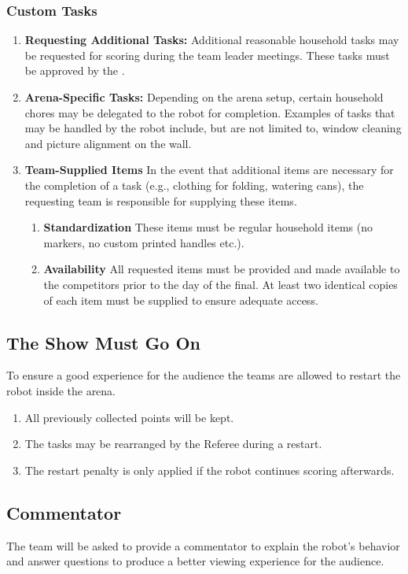 \subsubsection{Custom Tasks}
\begin{enumerate}[nosep]
  \item \textbf{Requesting Additional Tasks:} Additional reasonable household tasks may be requested for scoring during the team leader meetings. These tasks must be approved by the \TC{}.
  \item \textbf{Arena-Specific Tasks:} Depending on the arena setup, certain household chores may be delegated to the robot for completion. Examples of tasks that may be handled by the robot include, but are not limited to, window cleaning and picture alignment on the wall.
  \item \textbf{Team-Supplied Items} In the event that additional items are necessary for the completion of a task (e.g., clothing for folding, watering cans), the requesting team is responsible for supplying these items.
  \begin{enumerate}[nosep]
    \item \textbf{Standardization} These items must be regular household items (no markers, no custom printed handles etc.).
    \item \textbf{Availability} All requested items must be provided and made available to the competitors prior to the day of the final. At least two identical copies of each item must be supplied to ensure adequate access.
  \end{enumerate}
\end{enumerate}

\subsection{The Show Must Go On}
To ensure a good experience for the audience the teams are allowed to restart the robot inside the arena.
\begin{enumerate}[nosep]
  \item All previously collected points will be kept.
  \item The tasks may be rearranged by the Referee during a restart.
  \item The restart penalty is only applied if the robot continues scoring afterwards.
\end{enumerate}

\subsection{Commentator}
The team will be asked to provide a commentator to explain the robot's behavior and answer questions to produce a better viewing experience for the audience.


